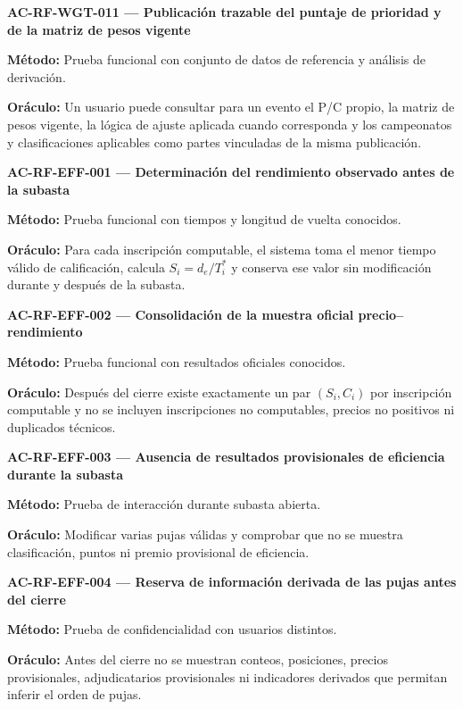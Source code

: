 \documentclass[10pt,letterpaper]{article}
\begin{document}
\noindent\textbf{AC-RF-WGT-011 --- Publicación trazable del puntaje de prioridad y de la matriz de pesos vigente}\par
\textbf{Método:} Prueba funcional con conjunto de datos de referencia y análisis de derivación.\par
\textbf{Oráculo:} Un usuario puede consultar para un evento el P/C propio, la matriz de pesos vigente, la lógica de ajuste aplicada cuando corresponda y los campeonatos y clasificaciones aplicables como partes vinculadas de la misma publicación.\par\vspace{0.45em}
\noindent\textbf{AC-RF-EFF-001 --- Determinación del rendimiento observado antes de la subasta}\par
\textbf{Método:} Prueba funcional con tiempos y longitud de vuelta conocidos.\par
\textbf{Oráculo:} Para cada inscripción computable, el sistema toma el menor tiempo válido de calificación, calcula $S_i=d_e/T_i^*$ y conserva ese valor sin modificación durante y después de la subasta.\par\vspace{0.45em}
\noindent\textbf{AC-RF-EFF-002 --- Consolidación de la muestra oficial precio--rendimiento}\par
\textbf{Método:} Prueba funcional con resultados oficiales conocidos.\par
\textbf{Oráculo:} Después del cierre existe exactamente un par $(S_i,C_i)$ por inscripción computable y no se incluyen inscripciones no computables, precios no positivos ni duplicados técnicos.\par\vspace{0.45em}
\noindent\textbf{AC-RF-EFF-003 --- Ausencia de resultados provisionales de eficiencia durante la subasta}\par
\textbf{Método:} Prueba de interacción durante subasta abierta.\par
\textbf{Oráculo:} Modificar varias pujas válidas y comprobar que no se muestra clasificación, puntos ni premio provisional de eficiencia.\par\vspace{0.45em}
\noindent\textbf{AC-RF-EFF-004 --- Reserva de información derivada de las pujas antes del cierre}\par
\textbf{Método:} Prueba de confidencialidad con usuarios distintos.\par
\textbf{Oráculo:} Antes del cierre no se muestran conteos, posiciones, precios provisionales, adjudicatarios provisionales ni indicadores derivados que permitan inferir el orden de pujas.\par\vspace{0.45em}
\end{document}
